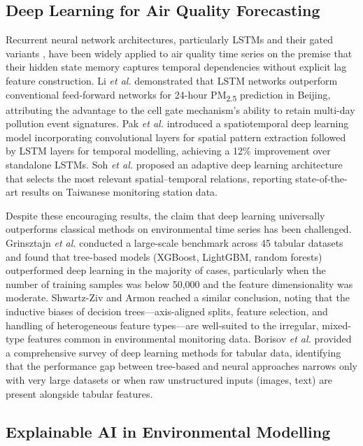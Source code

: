 \documentclass[conference]{IEEEtran}
\begin{document}
\subsection{Deep Learning for Air Quality Forecasting}

Recurrent neural network architectures, particularly LSTMs \cite{hochreiter1997} and their gated variants \cite{cho2014}, have been widely applied to air quality time series on the premise that their hidden state memory captures temporal dependencies without explicit lag feature construction. Li \textit{et al.} \cite{li2020} demonstrated that LSTM networks outperform conventional feed-forward networks for 24-hour PM\textsubscript{2.5} prediction in Beijing, attributing the advantage to the cell gate mechanism's ability to retain multi-day pollution event signatures. Pak \textit{et al.} \cite{pak2020} introduced a spatiotemporal deep learning model incorporating convolutional layers for spatial pattern extraction followed by LSTM layers for temporal modelling, achieving a 12\% improvement over standalone LSTMs. Soh \textit{et al.} \cite{soh2018} proposed an adaptive deep learning architecture that selects the most relevant spatial--temporal relations, reporting state-of-the-art results on Taiwanese monitoring station data.

Despite these encouraging results, the claim that deep learning universally outperforms classical methods on environmental time series has been challenged. Grinsztajn \textit{et al.} \cite{grinsztajn2022} conducted a large-scale benchmark across 45 tabular datasets and found that tree-based models (XGBoost, LightGBM, random forests) outperformed deep learning in the majority of cases, particularly when the number of training samples was below 50{,}000 and the feature dimensionality was moderate. Shwartz-Ziv and Armon \cite{shwartzziv2022} reached a similar conclusion, noting that the inductive biases of decision trees---axis-aligned splits, feature selection, and handling of heterogeneous feature types---are well-suited to the irregular, mixed-type features common in environmental monitoring data. Borisov \textit{et al.} \cite{borisov2022} provided a comprehensive survey of deep learning methods for tabular data, identifying that the performance gap between tree-based and neural approaches narrows only with very large datasets or when raw unstructured inputs (images, text) are present alongside tabular features.

\subsection{Explainable AI in Environmental Modelling}
\end{document}
